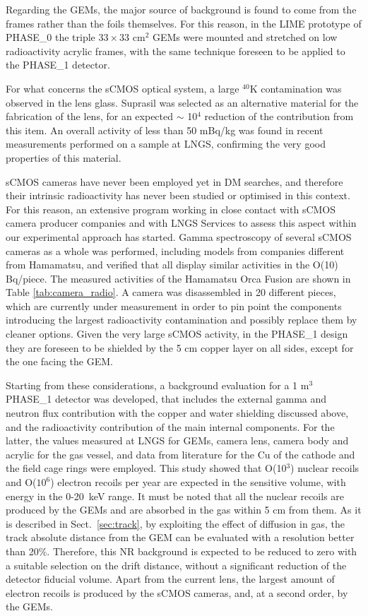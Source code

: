 \documentclass[physics,article,submit,moreauthors,pdftex]{Definitions/mdpi}
\begin{document}
Regarding the GEMs, the major source of background is found to come from the frames rather than the foils themselves. For this reason, in the LIME prototype of PHASE\_0 the triple $33 \times 33$ cm$^2$ GEMs were mounted and stretched on low radioactivity acrylic frames, with the same technique foreseen to be applied to the PHASE\_1 detector. 

For what concerns the sCMOS optical system, a large $^{40}$K contamination was observed in the lens glass. Suprasil was selected as an alternative material for the fabrication of the lens, for an expected $\sim$ 10$^4$ reduction of the contribution from this item. An overall activity of less than 50 mBq/kg was found in recent measurements performed on a sample at LNGS, confirming the very good properties of this material.

sCMOS cameras have never been employed yet in DM searches, and therefore their intrinsic radioactivity has never been studied or optimised in this context. For this reason, an extensive program working in close contact with sCMOS camera producer companies and with LNGS Services to assess this aspect within our experimental approach has started. Gamma spectroscopy of several sCMOS cameras as a whole was performed, including models from companies different from Hamamatsu, and verified that all display similar activities in the O(10) Bq/piece. The measured activities of the Hamamatsu Orca Fusion are shown in Table \ref{tab:camera_radio}. A camera was disassembled in 20 different pieces, which are currently under measurement in order to pin point the components introducing the largest radioactivity contamination and possibly replace them by cleaner options. Given the very large sCMOS activity, in the PHASE\_1 design they are foreseen to be shielded by the 5 cm copper layer on all sides, except for the one facing the GEM.

Starting from these considerations, a background evaluation for a 1 m$^3$ PHASE\_1 detector was developed, that includes the external gamma and neutron flux contribution with the copper and water shielding discussed above, and the radioactivity contribution of the main internal components. For the latter,  the values measured at LNGS for GEMs, camera lens, camera body and acrylic for the gas vessel, and data from literature for the Cu of the cathode and the field cage rings \cite{bib:trex}  were employed. This study showed that O(10$^3$) nuclear recoils and O($10^6$) electron recoils per year are expected in the sensitive volume, with energy in the 0-20~keV range. It must be noted that all the nuclear recoils are produced by the GEMs and are absorbed in the gas within 5 cm from them. As it is described in Sect.~\ref{sec:track}, by exploiting the effect of diffusion in gas, the track absolute distance from the GEM can be evaluated with a resolution better than 20\%. Therefore, this NR background is expected to be reduced to zero with a suitable selection on the drift distance, without a significant reduction of the detector fiducial volume. Apart from the current lens, the largest amount of electron recoils is produced by the sCMOS cameras, and, at a second order, by the GEMs.
\end{document}

